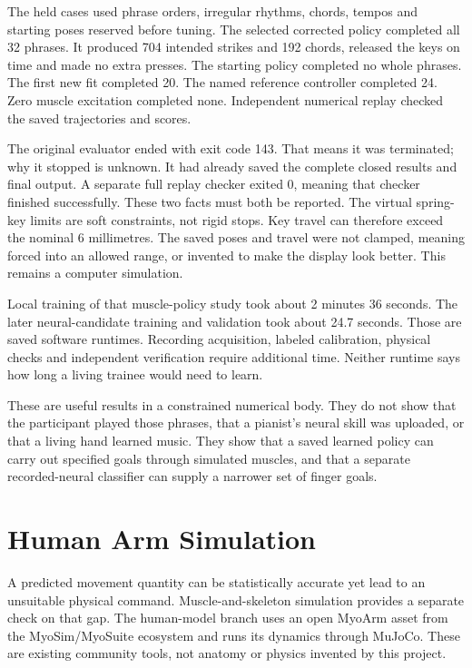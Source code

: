 The held cases used phrase orders, irregular rhythms, chords, tempos and starting
poses reserved before tuning. The selected corrected policy completed all 32
phrases. It produced 704 intended strikes and 192 chords, released the keys on
time and made no extra presses. The starting policy completed no whole phrases.
The first new fit completed 20. The named reference controller completed 24.
Zero muscle excitation completed none. Independent numerical replay checked the
saved trajectories and scores.

The original evaluator ended with exit code 143. That means it was terminated; why it stopped is unknown. It had already saved the complete closed results and final output. A separate full replay checker exited 0, meaning that checker finished successfully. These two facts must both be reported. The virtual spring-key limits are soft constraints, not rigid stops. Key travel can therefore exceed the nominal 6 millimetres. The saved poses and travel were not clamped, meaning forced into an allowed range, or invented to make the display look better. This remains a computer simulation.

Local training of that muscle-policy study took about 2 minutes 36 seconds.
The later neural-candidate training and validation took about 24.7 seconds.
Those are saved software runtimes. Recording acquisition, labeled calibration,
physical checks and independent verification require additional time. Neither
runtime says how long a living trainee would need to learn.

These are useful results in a constrained numerical body. They do not show that
the participant played those phrases, that a pianist's neural skill was uploaded,
or that a living hand learned music. They show that a saved learned policy can
carry out specified goals through simulated muscles, and that a separate
recorded-neural classifier can supply a narrower set of finger goals.



\section{Human Arm Simulation}

A predicted movement quantity can be statistically accurate yet lead to an unsuitable physical command. Muscle-and-skeleton simulation provides a separate check on that gap. The human-model branch uses an open MyoArm asset from the MyoSim/MyoSuite ecosystem and runs its dynamics through MuJoCo. These are existing community tools, not anatomy or physics invented by this project.\cite{myosim2026,myosuite2022,mujoco2012}

